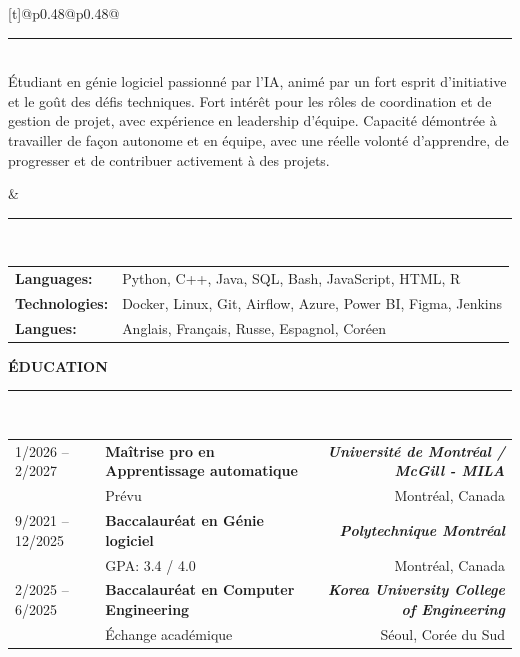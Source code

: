\documentclass[a4paper,10pt]{article}
\begin{document}
    \noindent
    \begin{tabularx}{\textwidth}[t]{@{}p{0.48\textwidth}@{\hspace{2em}}p{0.48\textwidth}@{}}
      \parbox[t]{\linewidth}{
        \hspace{6em}\rule{\dimexpr\linewidth-6.2em}{0.4pt} \\[0.5em]
        Étudiant en génie logiciel passionné par l'IA, animé par un fort esprit d’initiative et le goût des défis techniques. Fort intérêt pour les rôles de coordination et de gestion de projet, avec expérience en leadership d'équipe. Capacité démontrée à travailler de façon autonome et en équipe, avec une réelle volonté d’apprendre, de progresser et de contribuer activement à des projets.
      }
      &
      \parbox[t]{\linewidth}{
        \hspace{9em}\rule{\dimexpr\linewidth-9.5em}{0.5pt} \\[1em]
        \begin{tabular}{@{}p{2.5cm}p{\dimexpr\linewidth-3.2cm}@{}}
          \textbf{Languages:} & Python, C++, Java, SQL, Bash, JavaScript, HTML, R \\[1.5em]
          \textbf{Technologies:} & Docker, Linux, Git, Airflow, Azure, Power BI, Figma, Jenkins
          \\[1.5em]
          \textbf{Langues:} & Anglais, Français, Russe, Espagnol, Coréen
        \end{tabular}
      }
    \end{tabularx}
    
    \vspace{0.2em}
    \textbf{\large ÉDUCATION} \hspace{1em}\rule{\dimexpr\linewidth-8em}{0.4pt} \\[0em]
    
    \begin{tabularx}{\textwidth}{@{}p{3cm} X r@{}}
        1/2026 -- 2/2027 & 
        \textbf{Maîtrise pro en Apprentissage automatique} 
        & \textbf{\textit{Université de Montréal / McGill  - MILA}} \\ 
        & Prévu & 
        Montréal, Canada \\[0.2em]
        
        9/2021 -- 12/2025 & 
        \textbf{Baccalauréat en Génie logiciel} 
        & \textbf{\textit{Polytechnique Montréal}} \\ 
        & GPA: 3.4 / 4.0 & 
        Montréal, Canada \\[0.2em]
        
        2/2025 -- 6/2025 & 
        \textbf{Baccalauréat en Computer Engineering} 
        & \textbf{\textit{Korea University College of Engineering}} \\ 
        & Échange académique & 
        Séoul, Corée du Sud &
    \end{tabularx}
    
\end{document}
